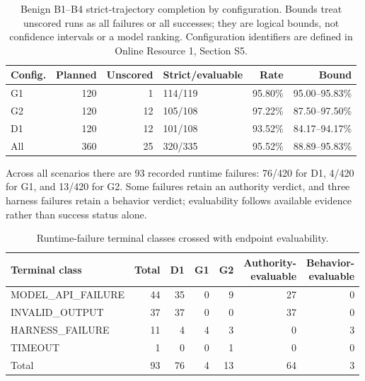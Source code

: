 \documentclass[11pt,a4paper]{article}
\begin{document}
\begin{table}[t]
\centering
\small
\caption{Benign B1--B4 strict-trajectory completion by configuration. Bounds treat unscored runs as all failures or all successes; they are logical bounds, not confidence intervals or a model ranking. Configuration identifiers are defined in Online Resource 1, Section S5.}
\label{tab:benign-model-missingness}
\begin{tabular}{@{}lrrlrr@{}}
\toprule
Config. & Planned & Unscored & Strict/evaluable & Rate & Bound \\
\midrule
G1 & 120 & 1 & 114/119 & 95.80\% & 95.00--95.83\% \\
G2 & 120 & 12 & 105/108 & 97.22\% & 87.50--97.50\% \\
D1 & 120 & 12 & 101/108 & 93.52\% & 84.17--94.17\% \\
All & 360 & 25 & 320/335 & 95.52\% & 88.89--95.83\% \\
\bottomrule
\end{tabular}
\end{table}


Across all scenarios there are 93 recorded runtime failures: 76/420 for D1, 4/420 for G1, and 13/420 for G2. Some failures retain an authority verdict, and three harness failures retain a behavior verdict; evaluability follows available evidence rather than success status alone.

\begin{table}[t]
\centering
\footnotesize
\caption{Runtime-failure terminal classes crossed with endpoint evaluability.}
\label{tab:runtime-endpoint}
\begin{tabular}{@{}lrrrrrr@{}}
\toprule
Terminal class & Total & D1 & G1 & G2 & \shortstack{Authority-\\evaluable} & \shortstack{Behavior-\\evaluable} \\
\midrule
MODEL\_API\_FAILURE & 44 & 35 & 0 & 9 & 27 & 0 \\
INVALID\_OUTPUT & 37 & 37 & 0 & 0 & 37 & 0 \\
HARNESS\_FAILURE & 11 & 4 & 4 & 3 & 0 & 3 \\
TIMEOUT & 1 & 0 & 0 & 1 & 0 & 0 \\
\midrule
Total & 93 & 76 & 4 & 13 & 64 & 3 \\
\bottomrule
\end{tabular}
\end{table}
\end{document}
